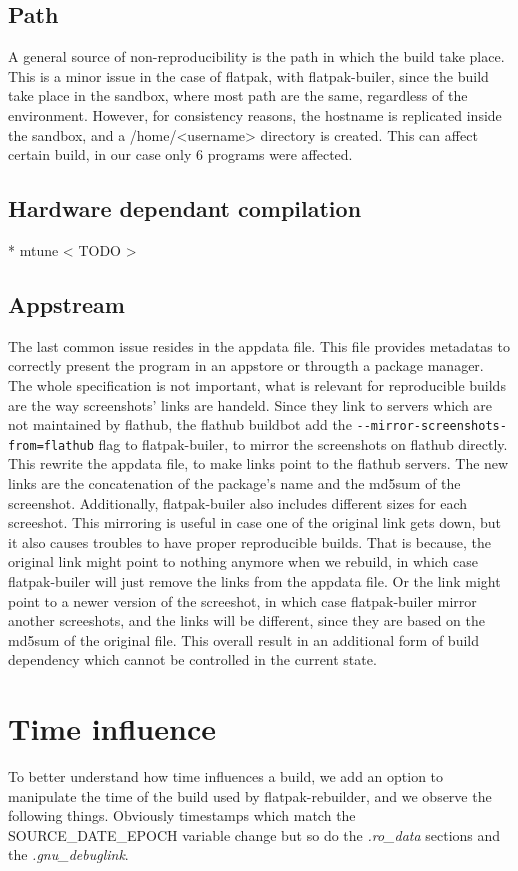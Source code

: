 \documentclass[a4paper,11pt,oneside]{report}
\theoremstyle{definition}
\newcommand{\sysname}{flatpak-rebuilder\xspace}
\newcommand{\rb}{reproducible builds\xspace}
\newcommand{\fp}{flatpak\xspace}
\newcommand{\fh}{flathub\xspace}
\newcommand{\fb}{flatpak-builer\xspace}
\newcommand{\sde}{SOURCE\_DATE\_EPOCH\xspace}
\newcommand{\fhbb}{flathub buildbot\xspace}
\begin{document}
\subsection*{Path}
A general source of non-reproducibility is the path in which the build take
place. This is a minor issue in the case of \fp, with \fb, since the build take
place in the sandbox, where most path are the same, regardless of the
environment. However, for consistency reasons, the hostname is replicated
inside the sandbox, and a /home/<username> directory is created. This can
affect certain build, in our case only 6 programs were affected.

\subsection*{Hardware dependant compilation}

* mtune
< TODO >

\subsection*{Appstream}
The last common issue resides in the appdata file. This file provides metadatas
to correctly present the program in an appstore or througth a package manager.
The whole specification is not important, what is relevant for \rb are the way
screenshots' links are handeld. Since they link to servers which are not
maintained by \fh, the \fhbb add the \verb|--mirror-screenshots-from=flathub|
flag to \fb, to mirror the screenshots on \fh directly. This rewrite the
appdata file, to make links point to the \fh servers. The new links are the
concatenation of the package's name and the md5sum of the screenshot.
Additionally, \fb also includes different sizes for each screeshot. This
mirroring is useful in case one of the original link gets down, but it also
causes troubles to have proper \rb. That is because, the original link might
point to nothing anymore when we rebuild, in which case \fb will just remove
the links from the appdata file. Or the link might point to a newer version of
the screeshot, in which case \fb mirror another screeshots, and the links will
be different, since they are based on the md5sum of the original file. This
overall result in an additional form of build dependency which cannot be
controlled in the current state.

\section*{Time influence}
To better understand how time influences a build, we add an option to manipulate
the time of the build used by \sysname, and we observe the following things.
Obviously timestamps which match the \sde variable change but so do the
\emph{.ro\_data} sections and the \emph{.gnu\_debuglink}.
\end{document}
